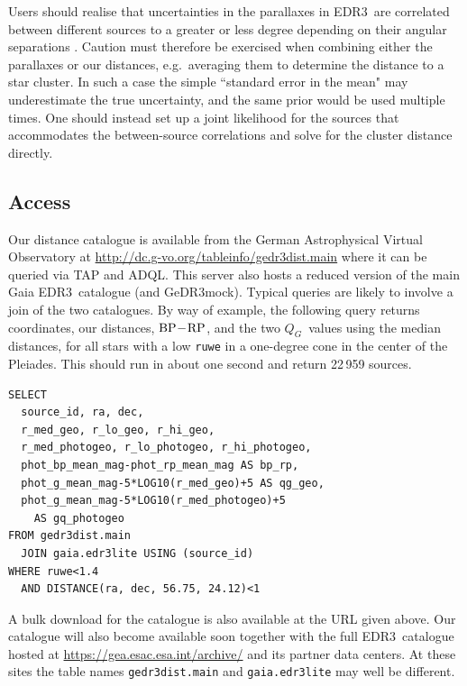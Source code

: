 \documentclass[twocolumn]{aastex62}
\providecommand{\mock}{GeDR3mock}
\providecommand{\release}{EDR3}
\providecommand{\QG}{\ensuremath{Q_G}}
\providecommand{\bprp}{\ensuremath{{\rm BP} \! - \! {\rm RP}}}
\begin{document}
Users should realise that uncertainties in the parallaxes in \release\ are correlated between different sources to a greater or less degree depending on their angular separations \citep{lindegren_etal_gedr3_astrometry, fabricius_etal_gedr3_validation}. Caution must therefore be exercised when combining either the parallaxes or our distances, e.g.\ averaging them to determine the distance to a star cluster. In such a case the simple ``standard error in the mean" may underestimate the true uncertainty, and the same prior would be used multiple times. One should instead set up a joint likelihood for the sources that accommodates the between-source correlations and solve for the cluster distance directly. 


\subsection{Access}\label{sec:access}

Our distance catalogue is available from the German Astrophysical Virtual Observatory at
\url{http://dc.g-vo.org/tableinfo/gedr3dist.main} where it can be queried via TAP and ADQL. 
This server also hosts a reduced version of the main Gaia \release\ catalogue (and \mock). Typical queries are likely to involve a join of the two catalogues. By way of example, the following query returns coordinates, our distances, \bprp, and the two \QG\ values using the median distances, for all stars with a low {\tt ruwe} in a one-degree cone in the center of the Pleiades.
This should run in about one second and return 22\,959 sources.

\small{
\begin{verbatim}
SELECT 
  source_id, ra, dec,
  r_med_geo, r_lo_geo, r_hi_geo,
  r_med_photogeo, r_lo_photogeo, r_hi_photogeo,
  phot_bp_mean_mag-phot_rp_mean_mag AS bp_rp,
  phot_g_mean_mag-5*LOG10(r_med_geo)+5 AS qg_geo,
  phot_g_mean_mag-5*LOG10(r_med_photogeo)+5 
    AS gq_photogeo
FROM gedr3dist.main
  JOIN gaia.edr3lite USING (source_id)
WHERE ruwe<1.4 
  AND DISTANCE(ra, dec, 56.75, 24.12)<1
\end{verbatim}
}

A bulk download for the catalogue is also available at the URL given above. Our catalogue will also become available soon
together with the full \release\ catalogue hosted at
\url{https://gea.esac.esa.int/archive/} and its partner data centers.
At these sites the table names \verb|gedr3dist.main| and \verb|gaia.edr3lite| may well be different.
\end{document}
